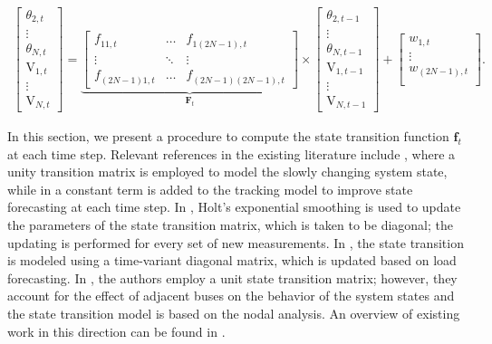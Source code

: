 \documentclass[10pt,journal,twocolumn]{IEEEtran}\IEEEoverridecommandlockouts
\begin{document}
\begin{figure*}[!th]
\normalsize
\begin{eqnarray}\label{eq:state_update}
\left[
\begin{array}{c}
\theta_{2,t}\\
\vdots\\
\theta_{N,t}\\
\mathrm{V}_{1,t}\\
\vdots\\
\mathrm{V}_{N,t}
\end{array}
\right] =
\underbrace{\left[
\begin{matrix}
\mathit{f}_{11,t} & \dots & \mathit{f}_{1(2N-1),t}\\
\vdots & \ddots & \vdots\\
\mathit{f}_{(2N-1)1,t} & \dots & \mathit{f}_{(2N-1)(2N-1),t}
\end{matrix}\right]}_{\boldsymbol{F}_{t}}\times
\left[
\begin{array}{c}
\theta_{2,t-1}\\
\vdots\\
\theta_{N,t-1}\\
\mathrm{V}_{1,t-1}\\
\vdots\\
\mathrm{V}_{N,t-1}
\end{array}
\right] +
\left[
\begin{array}{c}
w_{1,t}\\
\vdots \\
w_{(2N-1),t}\\
\end{array}
\right].
\end{eqnarray}
\hrulefill
\end{figure*}

In this section, we present a procedure to compute the state transition function $\boldsymbol{f}_{t}$ at each time step. Relevant references in the existing literature include \cite{Debs1970}, where a unity transition matrix is employed to model the slowly changing system state, while in \cite{Nishiya1982} a constant term is added to the tracking model to improve state forecasting at each time step. In \cite{LeitedaSilva1983}, Holt's exponential smoothing is used to update the parameters of the state transition matrix, which is taken to be diagonal; the updating is performed for every set of new measurements. In \cite{Morvaj1985}, the state transition is modeled using a time-variant diagonal matrix, which is updated based on load forecasting. In \cite{Durgaprasad1998}, the authors employ a unit state transition matrix; however, they account for the effect of adjacent buses on the behavior of the system states and the state transition model is based on the nodal analysis. An overview of existing work in this direction can be found in \cite{BrownDoCouttoFilho2009}.
\end{document}

